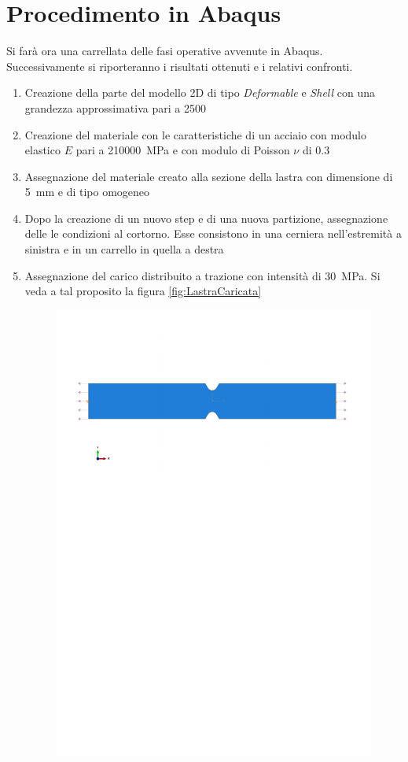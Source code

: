 \section{Procedimento in Abaqus}
Si farà ora una carrellata delle fasi operative avvenute in Abaqus. Successivamente si riporteranno i risultati ottenuti e i relativi confronti.
\begin{enumerate}
    \item Creazione della parte del modello 2D di tipo \emph{Deformable} e \emph{Shell} con una grandezza approssimativa pari a \SI{2500}{}
    \item Creazione del materiale con le caratteristiche di un acciaio con modulo elastico $E$ pari a \SI{210000}{\mega\pascal} e con modulo di Poisson $\nu$ di \SI{0.3}{}
    \item Assegnazione del materiale creato alla sezione della lastra con dimensione di \SI{5}{\milli\metre} e di tipo omogeneo
    \item Dopo la creazione di un nuovo step e di una nuova partizione, assegnazione delle le condizioni al cortorno. Esse consistono in una cerniera nell'estremità a sinistra e in un carrello in quella a destra
    \item Assegnazione del carico distribuito a trazione con intensità di \SI{30}{\mega\pascal}. Si veda a tal proposito la figura \ref{fig:LastraCaricata}
    \begin{figure}[htb]
        \centering
        \includegraphics[width=\textwidth]{rel2/img2/LastraCaricata.pdf}

\end{figure}
\end{enumerate}
